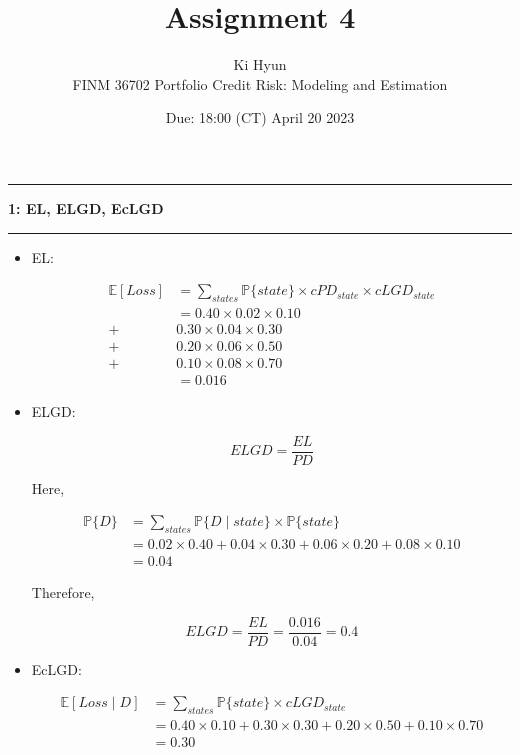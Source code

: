 \documentclass[11pt]{article}
\newcommand\question[2]{\vspace{.25in}\hrule\textbf{#1: #2}\vspace{.5em}\hrule\vspace{.10in}}
\renewcommand\part[1]{\vspace{.10in}\textbf{(#1)}}
\newcommand{\Exp}{\mathbb{E}}
\renewcommand{\P}{\mathbb{P}}
\begin{document}
\raggedright


\newcommand\NAME{Ki Hyun}  %
\newcommand\ClassNumber{FINM 36702}
\newcommand\ClassName{Portfolio Credit Risk: Modeling and Estimation}    
\newcommand\ANUM{4}              %
\newcommand\duedate{18:00 (CT) April 20 2023}	%

\title{Assignment \ANUM}
\author{\NAME \\ 
\ClassNumber \text{:} \ClassName}
\date{Due: \duedate}

\maketitle


\question{1}{EL, ELGD, EcLGD}

\begin{itemize}

\item EL:

$$
\begin{aligned}
\Exp[Loss] &= \sum_{states} \P\{state\} 
\times cPD_{state} \times cLGD_{state} \\
&= 0.40 \times 0.02 \times 0.10 \\
+& 0.30 \times 0.04 \times 0.30 \\
+& 0.20 \times 0.06 \times 0.50 \\
+& 0.10 \times 0.08 \times 0.70 \\
&= 0.016 
\end{aligned}
$$

\item ELGD:

$$
ELGD = \frac{EL}{PD}
$$

Here,

$$
\begin{aligned}
\P\{D\} &= \sum_{states} \P\{D \mid state \} 
\times \P\{state\} \\
&= 0.02 \times 0.40 +
0.04 \times 0.30 +
0.06 \times 0.20 +
0.08 \times 0.10 \\
&= 0.04 
\end{aligned}
$$

Therefore,

$$
ELGD = \frac{EL}{PD}
= \frac{0.016}{0.04}
= 0.4
$$

\item EcLGD:

$$
\begin{aligned}
\Exp[Loss \mid D] &= \sum_{states} \P\{state\} 
\times cLGD_{state} \\
&= 0.40 \times 0.10 
+ 0.30 \times 0.30 
+ 0.20 \times 0.50 
+ 0.10 \times 0.70 \\
&= 0.30
\end{aligned}
$$

\end{itemize}
\end{document}

